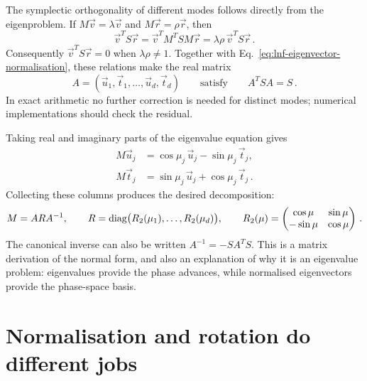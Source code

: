 The symplectic orthogonality of different modes follows directly from
the eigenproblem. If $M\vec v = \lambda\vec v$ and
$M\vec r = \rho\vec r$, then
\begin{equation}
    \vec v^T S\vec r = \vec v^T M^T S M\vec r = \lambda\rho\,\vec v^T S\vec r\,.
\end{equation}
Consequently $\vec v^T S\vec r = 0$ when $\lambda\rho\ne1$.
Together with Eq.~\eqref{eq:lnf-eigenvector-normalisation}, these relations
make the real matrix
\begin{equation}\label{eq:lnf-normalisation-matrix}
    A = (\vec u_1,\vec t_1,\ldots,\vec u_d,\vec t_d)
    \qquad\text{satisfy}\qquad A^T S A = S\,.
\end{equation}
In exact arithmetic no further correction is needed for distinct modes;
numerical implementations should check the residual.

Taking real and imaginary parts of the eigenvalue equation gives
\begin{align}
    M\vec u_j& = \cos\mu_j\,\vec u_j-\sin\mu_j\,\vec t_j,\\
    M\vec t_j& = \sin\mu_j\,\vec u_j + \cos\mu_j\,\vec t_j\,.
\end{align}
Collecting these columns produces the desired decomposition:
\begin{equation}\label{eq:lnf-matrix-normal-form}
    M = A R A^{-1},\qquad
    R = \operatorname{diag}\bigl(R_2(\mu_1),\ldots,R_2(\mu_d)\bigr),
    \qquad
    R_2(\mu) = \begin{pmatrix}
    \cos\mu&\sin\mu\\-\sin\mu&\cos\mu
    \end{pmatrix}\,.
\end{equation}
The canonical inverse can also be written $A^{-1} = -S A^T S$.
This is a matrix derivation of the normal form, and also an explanation
of why it is an eigenvalue problem: eigenvalues provide the phase
advances, while normalised eigenvectors provide the phase-space basis.



\section{Normalisation and rotation do different jobs}
\label{sec:lnf-geometry-dynamics}


